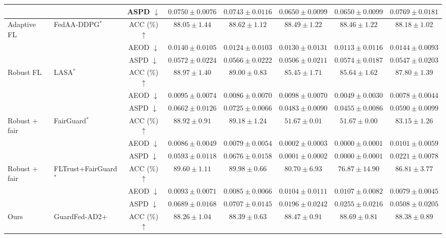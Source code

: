 \begin{table}[t]
{\begin{tabular}{l|l|c|ccccc}
 &  & ASPD $\downarrow$ & $0.0750 \pm 0.0076$ & $0.0743 \pm 0.0116$ & $0.0650 \pm 0.0099$ & $0.0650 \pm 0.0099$ & $0.0769 \pm 0.0181$ \\
\hline
\multirow{3}{*}{Adaptive FL} & \multirow{3}{*}{FedAA-DDPG$^{*}$} & ACC (\%) $\uparrow$ & $88.05 \pm 1.44$ & $88.62 \pm 1.12$ & $88.49 \pm 1.22$ & $88.46 \pm 1.22$ & $88.18 \pm 1.02$ \\
 &  & AEOD $\downarrow$ & $0.0140 \pm 0.0105$ & $0.0124 \pm 0.0103$ & $0.0130 \pm 0.0131$ & $0.0113 \pm 0.0116$ & $0.0144 \pm 0.0093$ \\
 &  & ASPD $\downarrow$ & $0.0572 \pm 0.0224$ & $0.0566 \pm 0.0222$ & $0.0506 \pm 0.0211$ & $0.0574 \pm 0.0187$ & $0.0547 \pm 0.0203$ \\
\hline
\multirow{3}{*}{Robust FL} & \multirow{3}{*}{LASA$^{*}$} & ACC (\%) $\uparrow$ & $88.97 \pm 1.40$ & $89.00 \pm 0.83$ & $85.45 \pm 1.71$ & $85.64 \pm 1.62$ & $87.80 \pm 1.39$ \\
 &  & AEOD $\downarrow$ & $0.0095 \pm 0.0074$ & $0.0086 \pm 0.0070$ & $0.0098 \pm 0.0070$ & $0.0049 \pm 0.0030$ & $0.0078 \pm 0.0044$ \\
 &  & ASPD $\downarrow$ & $0.0662 \pm 0.0126$ & $0.0725 \pm 0.0066$ & $0.0483 \pm 0.0090$ & $0.0455 \pm 0.0086$ & $0.0590 \pm 0.0099$ \\
\hline
\multirow{3}{*}{Robust + fair} & \multirow{3}{*}{FairGuard$^{*}$} & ACC (\%) $\uparrow$ & $88.92 \pm 0.91$ & $89.18 \pm 1.24$ & $51.67 \pm 0.01$ & $51.67 \pm 0.00$ & $83.15 \pm 1.26$ \\
 &  & AEOD $\downarrow$ & $0.0086 \pm 0.0049$ & $0.0079 \pm 0.0054$ & $0.0002 \pm 0.0003$ & $0.0000 \pm 0.0001$ & $0.0101 \pm 0.0059$ \\
 &  & ASPD $\downarrow$ & $0.0593 \pm 0.0118$ & $0.0676 \pm 0.0158$ & $0.0001 \pm 0.0002$ & $0.0000 \pm 0.0001$ & $0.0221 \pm 0.0078$ \\
\hline
\multirow{3}{*}{Robust + fair} & \multirow{3}{*}{FLTrust+FairGuard$^{*}$} & ACC (\%) $\uparrow$ & $89.60 \pm 1.11$ & $89.98 \pm 0.66$ & $80.70 \pm 6.93$ & $76.87 \pm 14.90$ & $86.81 \pm 3.77$ \\
 &  & AEOD $\downarrow$ & $0.0093 \pm 0.0071$ & $0.0085 \pm 0.0066$ & $0.0104 \pm 0.0111$ & $0.0107 \pm 0.0082$ & $0.0079 \pm 0.0045$ \\
 &  & ASPD $\downarrow$ & $0.0689 \pm 0.0168$ & $0.0707 \pm 0.0145$ & $0.0196 \pm 0.0242$ & $0.0255 \pm 0.0216$ & $0.0508 \pm 0.0205$ \\
\hline
\multirow{3}{*}{Ours} & \multirow{3}{*}{GuardFed-AD2+} & ACC (\%) $\uparrow$ & $88.26 \pm 1.04$ & $88.39 \pm 0.63$ & $88.47 \pm 0.91$ & $88.69 \pm 0.81$ & $88.38 \pm 0.89$ \\

\end{tabular}}
\end{table}
